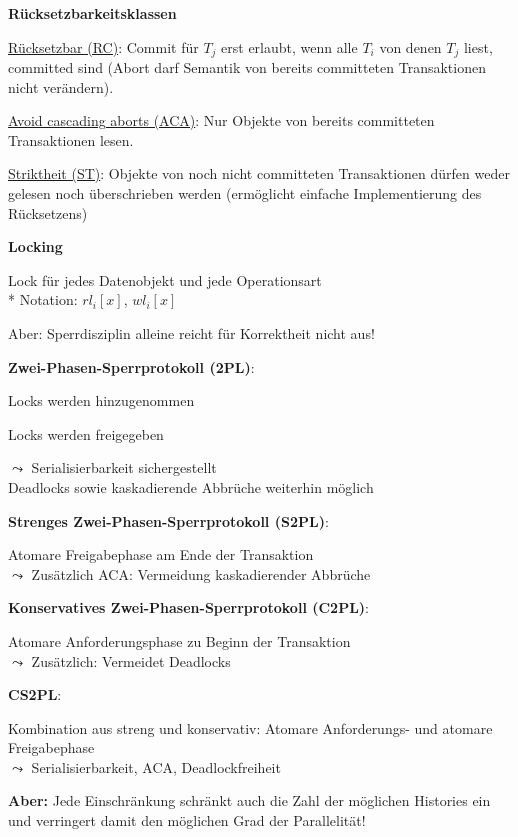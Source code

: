 \textbf{Rücksetzbarkeitsklassen}
\begin{items}
	\item \underline{Rücksetzbar (RC)}: Commit für $T_j$ erst erlaubt, wenn alle $T_i$ von denen $T_j$ liest, committed sind (Abort darf Semantik von bereits committeten Transaktionen nicht verändern).
	\item \underline{Avoid cascading aborts (ACA)}: Nur Objekte von bereits committeten Transaktionen lesen.
	\item \underline{Striktheit (ST)}: Objekte von noch nicht committeten Transaktionen dürfen weder gelesen noch überschrieben werden (ermöglicht einfache Implementierung des Rücksetzens)
\end{items}

\textbf{Locking}
\begin{items}
	\item Lock für jedes Datenobjekt und jede Operationsart
		\\*
		Notation: \( rl_i[x] \), \( wl_i[x] \)
	\item Aber: Sperrdisziplin alleine reicht für Korrektheit nicht aus!
	
	\item \textbf{Zwei-Phasen-Sperrprotokoll (2PL)}:
	\begin{enumeration}
		\item Locks werden hinzugenommen
		\item Locks werden freigegeben
	\end{enumeration}
	\( \leadsto \) Serialisierbarkeit sichergestellt\\
						Deadlocks sowie kaskadierende Abbrüche weiterhin möglich
	
	\item \textbf{Strenges Zwei-Phasen-Sperrprotokoll (S2PL)}: 
	
	Atomare Freigabephase am Ende der Transaktion\\
	\( \leadsto \) Zusätzlich ACA: Vermeidung kaskadierender Abbrüche
	
	\item \textbf{Konservatives Zwei-Phasen-Sperrprotokoll (C2PL)}:
	
	Atomare Anforderungsphase zu Beginn der Transaktion\\
	\( \leadsto \) Zusätzlich: Vermeidet Deadlocks
	
	\item \textbf{CS2PL}: 
	
	Kombination aus streng und konservativ: Atomare Anforderungs- und atomare Freigabephase \\
	\( \leadsto \) Serialisierbarkeit, ACA, Deadlockfreiheit
	
	\item \textbf{Aber:} Jede Einschränkung schränkt auch die Zahl der möglichen Histories ein und verringert damit den möglichen Grad der Parallelität!
	
\end{items}


